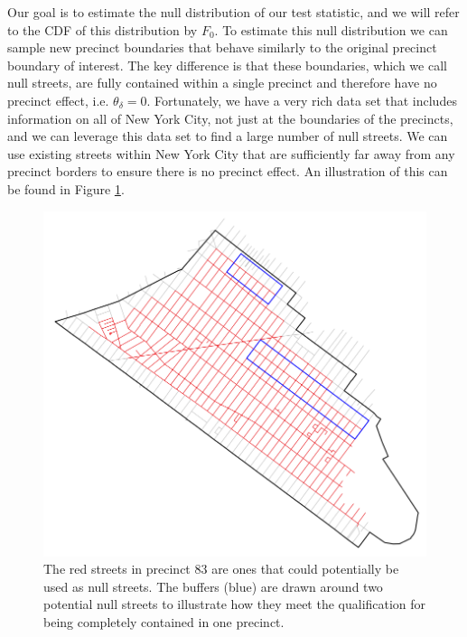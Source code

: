 \documentclass[a4paper,11pt]{article}
\begin{document}
Our goal is to estimate the null distribution of our test statistic, and we will refer to the CDF of this distribution by $F_0$. To estimate this null distribution we can sample new precinct boundaries that behave similarly to the original precinct boundary of interest. The key difference is that these boundaries, which we call null streets, are fully contained within a single precinct and therefore have no precinct effect, i.e. $\theta_{\delta} = 0$. Fortunately, we have a very rich data set that includes information on all of New York City, not just at the boundaries of the precincts, and we can leverage this data set to find a large number of null streets. We can use existing streets within New York City that are sufficiently far away from any precinct borders to ensure there is no precinct effect. An illustration of this can be found in Figure \ref{fig:NullStreets}. \begin{figure}[h]
    \centering
    \includegraphics[scale=0.3]{plots/NullStreetExample83.png}
        \caption{The red streets in precinct 83 are ones that could potentially be used as null streets. The buffers (blue) are drawn around two potential null streets to illustrate how they meet the qualification for being completely contained in one precinct.}
    \label{fig:NullStreets}
\end{figure}
\end{document}
